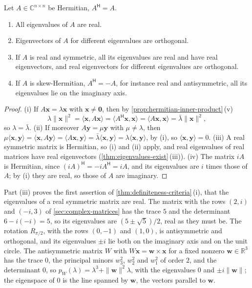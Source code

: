 \begin{proposition}
\label{prop:hermitian-eigen}
Let $A\in\mathbb C^{n\times n}$ be Hermitian, $A^{\mathsf H}=A$.
\begin{enumerate}
\item All eigenvalues of $A$ are real.
\item Eigenvectors of $A$ for different eigenvalues are orthogonal.
\item If $A$ is real and symmetric, all its eigenvalues are real and have real eigenvectors, and real eigenvectors for different eigenvalues are orthogonal.
\item If $A$ is skew-Hermitian, $A^{\mathsf H}=-A$, for instance real and antisymmetric, all its eigenvalues lie on the imaginary axis.
\end{enumerate}
\end{proposition}

\begin{proof}
(i) If $A\mathbf x=\lambda\mathbf x$ with $\mathbf x\ne\mathbf 0$, then by \cref{prop:hermitian-inner-product}\,(v)
\[
\lambda\|\mathbf x\|^2=\langle\mathbf x,A\mathbf x\rangle=\langle A^{\mathsf H}\mathbf x,\mathbf x\rangle=\langle A\mathbf x,\mathbf x\rangle=\bar\lambda\|\mathbf x\|^2 ,
\]
so $\lambda=\bar\lambda$. (ii) If moreover $A\mathbf y=\mu\mathbf y$ with $\mu\ne\lambda$, then $\mu\langle\mathbf x,\mathbf y\rangle=\langle\mathbf x,A\mathbf y\rangle=\langle A\mathbf x,\mathbf y\rangle=\bar\lambda\langle\mathbf x,\mathbf y\rangle=\lambda\langle\mathbf x,\mathbf y\rangle$, by (i), so $\langle\mathbf x,\mathbf y\rangle=0$. (iii) A real symmetric matrix is Hermitian, so (i) and (ii) apply, and real eigenvalues of real matrices have real eigenvectors (\cref{thm:eigenvalues-exist}\,(iii)). (iv) The matrix $iA$ is Hermitian, since $(iA)^{\mathsf H}=-iA^{\mathsf H}=iA$, and its eigenvalues are $i$ times those of $A$; by (i) they are real, so those of $A$ are imaginary.
\end{proof}

Part (iii) proves the first assertion of \cref{thm:definiteness-criteria}\,(i), that the eigenvalues of a real symmetric matrix are real. The matrix with the rows $(2,i)$ and $(-i,3)$ of \cref{sec:complex-matrices} has the trace $5$ and the determinant $6-i(-i)=5$, so its eigenvalues are $(5\pm\sqrt5)/2$, real as they must be. The rotation $R_{\pi/2}$, with the rows $(0,-1)$ and $(1,0)$, is antisymmetric and orthogonal, and its eigenvalues $\pm i$ lie both on the imaginary axis and on the unit circle. The antisymmetric matrix $W$ with $W\mathbf x=\mathbf w\times\mathbf x$ for a fixed nonzero $\mathbf w\in\mathbb R^3$ has the trace $0$, the principal minors $w_3^2$, $w_2^2$ and $w_1^2$ of order $2$, and the determinant $0$, so $p_W(\lambda)=\lambda^3+\|\mathbf w\|^2\lambda$, with the eigenvalues $0$ and $\pm i\|\mathbf w\|$; the eigenspace of $0$ is the line spanned by $\mathbf w$, the vectors parallel to $\mathbf w$.

